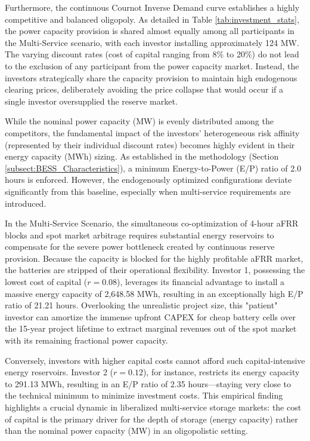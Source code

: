 Furthermore, the continuous Cournot Inverse Demand curve establishes a highly competitive and balanced oligopoly. As detailed in Table \ref{tab:investment_stats}, the power capacity provision is shared almost equally among all participants in the Multi-Service scenario, with each investor installing approximately 124 MW. The varying discount rates (cost of capital ranging from 8\% to 20\%) do not lead to the exclusion of any participant from the power capacity market. Instead, the investors strategically share the capacity provision to maintain high endogenous clearing prices, deliberately avoiding the price collapse that would occur if a single investor oversupplied the reserve market.

While the nominal power capacity (MW) is evenly distributed among the competitors, the fundamental impact of the investors' heterogeneous risk affinity (represented by their individual discount rates) becomes highly evident in their energy capacity (MWh) sizing. As established in the methodology (Section \ref{subsect:BESS_Characteristics}), a minimum Energy-to-Power (E/P) ratio of 2.0 hours is enforced. However, the endogenously optimized configurations deviate significantly from this baseline, especially when multi-service requirements are introduced.

In the Multi-Service Scenario, the simultaneous co-optimization of 4-hour aFRR blocks and spot market arbitrage requires substantial energy reservoirs to compensate for the severe power bottleneck created by continuous reserve provision. Because the capacity is blocked for the highly profitable aFRR market, the batteries are stripped of their operational flexibility. Investor 1, possessing the lowest cost of capital ($r = 0.08$), leverages its financial advantage to install a massive energy capacity of 2,648.58 MWh, resulting in an exceptionally high E/P ratio of 21.21 hours. Overlooking the unrealistic project size, this "patient" investor can amortize the immense upfront CAPEX for cheap battery cells over the 15-year project lifetime to extract marginal revenues out of the spot market with its remaining fractional power capacity.

Conversely, investors with higher capital costs cannot afford such capital-intensive energy reservoirs. Investor 2 ($r = 0.12$), for instance, restricts its energy capacity to 291.13 MWh, resulting in an E/P ratio of 2.35 hours---staying very close to the technical minimum to minimize investment costs. This empirical finding highlights a crucial dynamic in liberalized multi-service storage markets: the cost of capital is the primary driver for the depth of storage (energy capacity) rather than the nominal power capacity (MW) in an oligopolistic setting.

